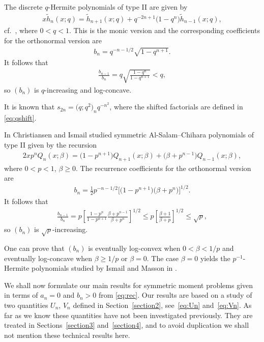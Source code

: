 \documentclass[pdftex]{sigma}
\numberwithin{equation}{section}
\begin{document}
\begin{ex}\label{thm:ops1} The discrete $q$-Hermite polynomials of type II are given by
\begin{gather*}
x\tilde{h}_n(x;q)=\tilde{h}_{n+1}(x;q)+q^{-2n+1}\big(1-q^n\big)\tilde{h}_{n-1}(x;q),
\end{gather*}
cf.~\cite{K:S}, where $0<q<1$. This is the monic version and the corresponding coefficients for the orthonormal version are
\begin{gather*}
b_n=q^{-n-1/2}\sqrt{1-q^{n+1}}.
\end{gather*}
It follows that
\begin{gather*}
\frac{b_{n-1}}{b_n}=q\sqrt{\frac{1-q^n}{1-q^{n+1}}}<q,
\end{gather*}
so $(b_n)$ is $q$-increasing and log-concave.

It is known that $s_{2n}=\big(q;q^2\big)_nq^{-n^2}$, where the shifted factorials are defined in \eqref{eq:qshift}.

In \cite{C:I} Christiansen and Ismail studied symmetric Al-Salam--Chihara polynomials of type II given by the recursion
\begin{gather*}
2xp^nQ_n(x;\beta)=\big(1-p^{n+1}\big)Q_{n+1}(x;\beta)+\big(\beta+p^{n-1}\big)Q_{n-1}(x;\beta),
\end{gather*}
where $0<p<1$, $\beta\ge 0$. The recurrence coefficients for the orthonormal version are
\begin{gather*}
b_n=\tfrac{1}{2}p^{-n-1/2}\big[\big(1-p^{n+1}\big)\big(\beta+p^n\big)\big]^{1/2}.
\end{gather*}
It follows that
\begin{gather*}
\frac{b_{n-1}}{b_n}=p\left[\frac{1-p^n}{1-p^{n+1}}\frac{\beta+p^{n-1}}{\beta+p^n}\right]^{1/2}\le p\left[\frac{\beta+1}{\beta+p}\right]^{1/2}\le\sqrt{p},
\end{gather*}
so $(b_n)$ is $\sqrt{p}$-increasing.

One can prove that $(b_n)$ is eventually log-convex when $0<\beta<1/p$ and eventually log-concave when $\beta\ge 1/p$ or $\beta=0$. The case $\beta=0$ yields the $p^{-1}$-Hermite polynomials studied by Ismail and Masson in \cite{I:M}.
\end{ex}

We shall now formulate our main results for symmetric moment problems given in terms of $a_n=0$ and $b_n>0$ from \eqref{eq:rec}. Our results are based on a study of two quantities $U_n$, $V_n$ defined in Section~\ref{section2}, see~\eqref{eq:Un} and~\eqref{eq:Vn}. As far as we know these quantities have not been investigated previously. They are treated in Sections~\ref{section3} and~\ref{section4}, and to avoid duplication we shall not mention these technical results here.
\end{document}

